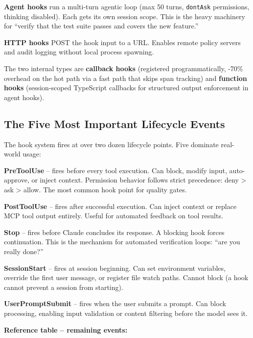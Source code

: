 \documentclass[
  english,
  11pt,
  letterpaper,
]{book}
\begin{document}
\textbf{Agent hooks} run a multi-turn agentic loop (max 50 turns,
\texttt{dontAsk} permissions, thinking disabled). Each gets its own
session scope. This is the heavy machinery for ``verify that the test
suite passes and covers the new feature.''

\textbf{HTTP hooks} POST the hook input to a URL. Enables remote policy
servers and audit logging without local process spawning.

The two internal types are \textbf{callback hooks} (registered
programmatically, -70\% overhead on the hot path via a fast path that
skips span tracking) and \textbf{function hooks} (session-scoped
TypeScript callbacks for structured output enforcement in agent hooks).

\subsection{The Five Most Important Lifecycle
Events}\label{the-five-most-important-lifecycle-events}

The hook system fires at over two dozen lifecycle points. Five dominate
real-world usage:

\textbf{PreToolUse} -- fires before every tool execution. Can block,
modify input, auto-approve, or inject context. Permission behavior
follows strict precedence: deny \textgreater{} ask \textgreater{} allow.
The most common hook point for quality gates.

\textbf{PostToolUse} -- fires after successful execution. Can inject
context or replace MCP tool output entirely. Useful for automated
feedback on tool results.

\textbf{Stop} -- fires before Claude concludes its response. A blocking
hook forces continuation. This is the mechanism for automated
verification loops: ``are you really done?''

\textbf{SessionStart} -- fires at session beginning. Can set environment
variables, override the first user message, or register file watch
paths. Cannot block (a hook cannot prevent a session from starting).

\textbf{UserPromptSubmit} -- fires when the user submits a prompt. Can
block processing, enabling input validation or content filtering before
the model sees it.

\textbf{Reference table -- remaining events:}
\end{document}

